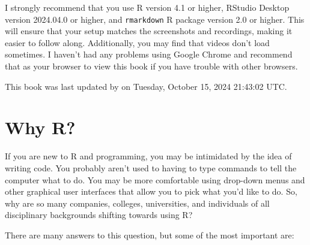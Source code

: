 \documentclass[]{tufte-book}
\begin{document}
I strongly recommend that you use R version 4.1 or higher, RStudio Desktop version 2024.04.0 or higher, and \texttt{rmarkdown} R package version 2.0 or higher. This will ensure that your setup matches the screenshots and recordings, making it easier to follow along. Additionally, you may find that videos don't load sometimes. I haven't had any problems using Google Chrome and recommend that as your browser to view this book if you have trouble with other browsers.

This book was last updated by on Tuesday, October 15, 2024 21:43:02 UTC.

\chapter{Why R?}\label{whyR}

If you are new to R and programming, you may be intimidated by the idea of writing code. You probably aren't used to having to type commands to tell the computer what to do. You may be more comfortable using drop-down menus and other graphical user interfaces that allow you to pick what you'd like to do. So, why are so many companies, colleges, universities, and individuals of all disciplinary backgrounds shifting towards using R?

There are many answers to this question, but some of the most important are:
\end{document}
